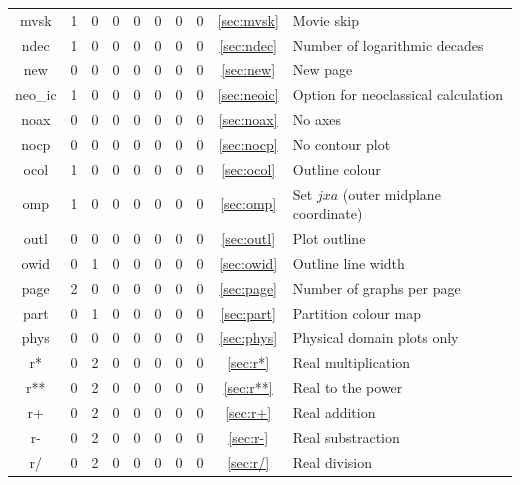 \documentclass[a4paper,10pt]{report}
\begin{document}
\begin{center}
\begin{longtable}{|c|c|c|c|c|c|c|c|c|l|}
    mvsk \index{b2plot, mvsk}      & 1 & 0 & 0 & 0 & 0 & 0 & 0 & \ref{sec:mvsk}   & Movie skip \\
    ndec \index{b2plot, ndec}      & 1 & 0 & 0 & 0 & 0 & 0 & 0 & \ref{sec:ndec}   & Number of logarithmic decades \\
    new \index{b2plot, new}        & 0 & 0 & 0 & 0 & 0 & 0 & 0 & \ref{sec:new}    & New page \\
    neo\_ic \index{b2plot, neo\_ic} & 1 & 0 & 0 & 0 & 0 & 0 & 0 & \ref{sec:neoic}   & Option for neoclassical calculation \\
    noax \index{b2plot, noax}      & 0 & 0 & 0 & 0 & 0 & 0 & 0 & \ref{sec:noax}   & No axes \\
    nocp \index{b2plot, nocp}      & 0 & 0 & 0 & 0 & 0 & 0 & 0 & \ref{sec:nocp}   & No contour plot \\
    ocol \index{b2plot, ocol}      & 1 & 0 & 0 & 0 & 0 & 0 & 0 & \ref{sec:ocol}   & Outline colour \\
    omp \index{b2plot, omp}        & 1 & 0 & 0 & 0 & 0 & 0 & 0 & \ref{sec:omp}    & Set $jxa$ (outer midplane coordinate) \\
    outl \index{b2plot, outl}      & 0 & 0 & 0 & 0 & 0 & 0 & 0 & \ref{sec:outl}   & Plot outline \\
    owid \index{b2plot, owid}      & 0 & 1 & 0 & 0 & 0 & 0 & 0 & \ref{sec:owid}   & Outline line width \\
    page \index{b2plot, page}      & 2 & 0 & 0 & 0 & 0 & 0 & 0 & \ref{sec:page}   & Number of graphs per page \\
    part \index{b2plot, part}      & 0 & 1 & 0 & 0 & 0 & 0 & 0 & \ref{sec:part}   & Partition colour map \\
    phys \index{b2plot, phys}      & 0 & 0 & 0 & 0 & 0 & 0 & 0 & \ref{sec:phys}   & Physical domain plots only \\
    r* \index{b2plot, r*}          & 0 & 2 & 0 & 0 & 0 & 0 & 0 & \ref{sec:r*}     & Real multiplication \\
    r** \index{b2plot, r**}        & 0 & 2 & 0 & 0 & 0 & 0 & 0 & \ref{sec:r**}    & Real to the power \\
    r+ \index{b2plot, r+}          & 0 & 2 & 0 & 0 & 0 & 0 & 0 & \ref{sec:r+}     & Real addition \\
    r- \index{b2plot, r-}          & 0 & 2 & 0 & 0 & 0 & 0 & 0 & \ref{sec:r-}     & Real substraction \\
    r/ \index{b2plot, r/}          & 0 & 2 & 0 & 0 & 0 & 0 & 0 & \ref{sec:r/}     & Real division \\

\end{longtable}
\end{center}
\end{document}
